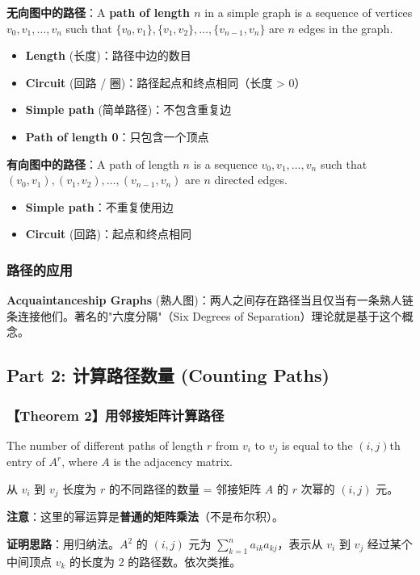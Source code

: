 \documentclass[10pt,a4paper,openany]{ctexbook}
\theoremstyle{definition}
\theoremstyle{remark}
\renewenvironment{quote}
  {\list{}{\leftmargin=1em\rightmargin=0pt\topsep=0.5pt\partopsep=0pt}\item[]}
  {\endlist}
\begin{document}
\textbf{无向图中的路径}：A \textbf{path of length $n$} in a simple graph is a sequence of vertices $v_0, v_1, \ldots, v_n$ such that $\{v_0, v_1\}, \{v_1, v_2\}, \ldots, \{v_{n-1}, v_n\}$ are $n$ edges in the graph.
\begin{itemize}
\item \textbf{Length} (长度)：路径中边的数目
\item \textbf{Circuit} (回路 / 圈)：路径起点和终点相同（长度 > 0）
\item \textbf{Simple path} (简单路径)：不包含重复边
\item \textbf{Path of length 0}：只包含一个顶点

\end{itemize}

\textbf{有向图中的路径}：A path of length $n$ is a sequence $v_0, v_1, \ldots, v_n$ such that $(v_0, v_1), (v_1, v_2), \ldots, (v_{n-1}, v_n)$ are $n$ directed edges.
\begin{itemize}
\item \textbf{Simple path}：不重复使用边
\item \textbf{Circuit} (回路)：起点和终点相同

\end{itemize}

\subsubsection{路径的应用}

\textbf{Acquaintanceship Graphs} (熟人图)：两人之间存在路径当且仅当有一条熟人链条连接他们。著名的"六度分隔"（Six Degrees of Separation）理论就是基于这个概念。
\vspace{-2pt}

\subsection{Part 2: 计算路径数量 (Counting Paths)}

\subsubsection{【Theorem 2】用邻接矩阵计算路径}

\begin{quote}
The number of different paths of length $r$ from $v_i$ to $v_j$ is equal to the $(i, j)$th entry of $A^r$, where $A$ is the adjacency matrix.

从 $v_i$ 到 $v_j$ 长度为 $r$ 的不同路径的数量 = 邻接矩阵 $A$ 的 $r$ 次幂的 $(i, j)$ 元。

\textbf{注意}：这里的幂运算是\textbf{普通的矩阵乘法}（不是布尔积）。

\textbf{证明思路}：用归纳法。$A^2$ 的 $(i, j)$ 元为 $\sum_{k=1}^n a_{ik}a_{kj}$，表示从 $v_i$ 到 $v_j$ 经过某个中间顶点 $v_k$ 的长度为 2 的路径数。依次类推。

\end{quote}
\end{document}
